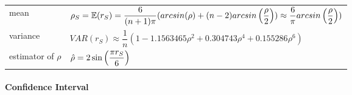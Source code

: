 \renewcommand{\arraystretch}{2}
\begin{table}[H]
    \begin{tabular}{l l}
        mean & $
            \rho_S 
            = \mathbb{E}(r_S)
            = \dfrac{6}{(n+1)\pi}
                (arcsin(\rho) + 
                (n - 2) arcsin\left(\dfrac{\rho}{2}\right))
            \approx \dfrac{6}{\pi} arcsin\left(\dfrac{\rho}{2}\right))
        $ \\

        variance & $
            VAR(r_S)
            \approx \dfrac{1}{n} 
                (1 - 1.1563465\rho^{2} + 0.304743\rho^{4} + 0.155286\rho^{6})
        $ \\

        estimator of $\rho$ & $
            \hat{\rho} = 2\sin\left(\dfrac{\pi r_S}{6} \right)
        $ \\

        
    \end{tabular}
\end{table}
\renewcommand{\arraystretch}{1}

\paragraph{Confidence Interval}

